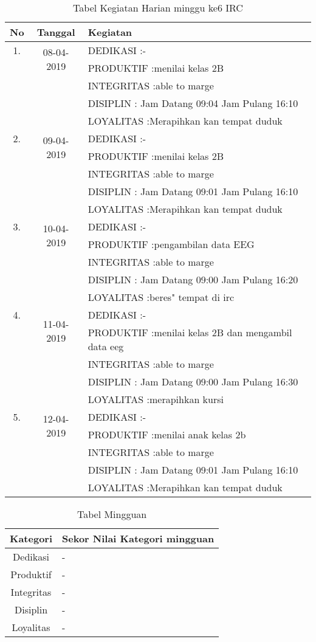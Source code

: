 \begin{table}[h]
\caption{Tabel Kegiatan Harian minggu ke6 IRC}
\centering
\begin{tabular}{|c|c|l|}
\hline
No&Tanggal&Kegiatan\\
\hline
1.&\multirow{2}{*}{08-04-2019}
&DEDIKASI :-\\
&&PRODUKTIF :menilai kelas 2B\\
&&INTEGRITAS :able to marge\\
&&DISIPLIN : Jam Datang 09:04 Jam Pulang 16:10\\
&&LOYALITAS :Merapihkan kan tempat duduk\\
\hline
2.&\multirow{2}{*}{09-04-2019}
&DEDIKASI :-\\
&&PRODUKTIF :menilai kelas 2B\\
&&INTEGRITAS :able to marge\\
&&DISIPLIN : Jam Datang 09:01 Jam Pulang 16:10\\
&&LOYALITAS :Merapihkan kan tempat duduk\\
\hline
3.&\multirow{2}{*}{10-04-2019}
&DEDIKASI :-\\
&&PRODUKTIF :pengambilan data EEG\\
&&INTEGRITAS :able to marge\\
&&DISIPLIN : Jam Datang 09:00 Jam Pulang 16:20\\
&&LOYALITAS :beres" tempat di irc\\
\hline
4.&\multirow{2}{*}{11-04-2019}
&DEDIKASI :-\\
&&PRODUKTIF :menilai kelas 2B dan mengambil data eeg\\
&&INTEGRITAS :able to marge\\
&&DISIPLIN : Jam Datang 09:00 Jam Pulang 16:30\\
&&LOYALITAS :merapihkan kursi\\
\hline
5.&\multirow{2}{*}{12-04-2019}
&DEDIKASI :-\\
&&PRODUKTIF :menilai anak kelas 2b\\
&&INTEGRITAS :able to marge\\
&&DISIPLIN : Jam Datang 09:01 Jam Pulang 16:10\\
&&LOYALITAS :Merapihkan kan tempat duduk\\
\hline
\end{tabular}
\label{table:contoh}
\end{table}



\begin{table}[h]
\begin{center}
\caption{Tabel Mingguan}
\begin{tabular}{|c|l|}
\hline
Kategori& Sekor Nilai Kategori mingguan\\
\hline
Dedikasi & -\\
\hline
Produktif & -\\
\hline
Integritas & -\\
\hline
Disiplin & -\\
\hline
Loyalitas & -\\
\hline
\end{tabular}
\end{center}
\label {Tabel:contoh} 
\end{table}


